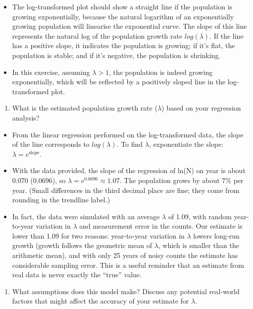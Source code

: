 \documentclass[
  a4paper]{book}
\providecommand{\tightlist}{%
  \setlength{\itemsep}{0pt}\setlength{\parskip}{0pt}}
\begin{document}
\begin{itemize}
\tightlist
\item
  The log-transformed plot should show a straight line if the population is growing exponentially, because the natural logarithm of an exponentially growing population will linearise the exponential curve. The slope of this line represents the natural log of the population growth rate \(log(\lambda)\). If the line has a positive slope, it indicates the population is growing; if it's flat, the population is stable; and if it's negative, the population is shrinking.
\item
  In this exercise, assuming \(\lambda > 1\), the population is indeed growing exponentially, which will be reflected by a positively sloped line in the log-transformed plot.
\end{itemize}

\begin{enumerate}
\def\labelenumi{\arabic{enumi}.}
\setcounter{enumi}{1}
\tightlist
\item
  What is the estimated population growth rate (\(\lambda\)) based on your regression analysis?
\end{enumerate}

\begin{itemize}
\tightlist
\item
  From the linear regression performed on the log-transformed data, the slope of the line corresponds to \(log(\lambda)\). To find \(\lambda\), exponentiate the slope: \(\lambda = e^{\text{slope}}\).
\item
  With the data provided, the slope of the regression of ln(N) on year is about 0.070 (0.0696), so \(\lambda = e^{0.0696} \approx 1.07\). The population grows by about 7\% per year. (Small differences in the third decimal place are fine; they come from rounding in the trendline label.)
\item
  In fact, the data were simulated with an average \(\lambda\) of 1.09, with random year-to-year variation in \(\lambda\) and measurement error in the counts. Our estimate is lower than 1.09 for two reasons: year-to-year variation in \(\lambda\) lowers long-run growth (growth follows the geometric mean of \(\lambda\), which is smaller than the arithmetic mean), and with only 25 years of noisy counts the estimate has considerable sampling error. This is a useful reminder that an estimate from real data is never exactly the ``true'' value.
\end{itemize}

\begin{enumerate}
\def\labelenumi{\arabic{enumi}.}
\setcounter{enumi}{2}
\tightlist
\item
  What assumptions does this model make? Discuss any potential real-world factors that might affect the accuracy of your estimate for \(\lambda\).
\end{enumerate}
\end{document}

